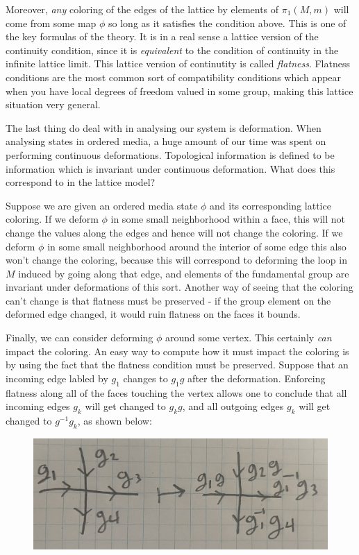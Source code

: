 \documentclass{article}
\theoremstyle{definition}
\numberwithin{figure}{section}
\begin{document}
Moreover, \textit{any} coloring of the edges of the lattice by elements of $\pi_1(M,m)$ will come from some map $\phi$ so long as it satisfies the condition above. This is one of the key formulas of the theory. It is in a real sense a lattice version of the continuity condition, since it is \textit{equivalent} to the condition of continuity in the infinite lattice limit. This lattice version of continutity is called \textit{flatness}. Flatness conditions are the most common sort of compatibility conditions which appear when you have local degrees of freedom valued in some group, making this lattice situation very general.

The last thing do deal with in analysing our system is deformation. When analysing states in ordered media, a huge amount of our time was spent on performing continuous deformations. Topological information is defined to be information which is invariant under continuous deformation. What does this correspond to in the lattice model?

Suppose we are given an ordered media state $\phi$ and its corresponding lattice coloring. If we deform $\phi$ in some small neighborhood within a face, this will not change the values along the edges and hence will not change the coloring. If we deform $\phi$ in some small neighborhood around the interior of some edge this also won't change the coloring, because this will correspond to deforming the loop in $M$ induced by going along that edge, and elements of the fundamental group are invariant under deformations of this sort. Another way of seeing that the coloring can't change is that flatness must be preserved - if the group element on the deformed edge changed, it would ruin flatness on the faces it bounds.

Finally, we can consider deforming $\phi$ around some vertex. This certainly \textit{can} impact the coloring. An easy way to compute how it must impact the coloring is by using the fact that the flatness condition must be preserved. Suppose that an incoming edge labled by $g_1$ changes to $g_1 g$ after the deformation. Enforcing flatness along all of the faces touching the vertex allows one to conclude that all incoming edges $g_k$ will get changed to $g_k g$, and all outgoing edges $g_k$ will get changed to $g^{-1}g_k$, as shown below:

\begin{figure}[h]
\begin{center}
\includegraphics[scale=.04]{gauge-transformation}
\end{center}
\end{figure}
\end{document}
